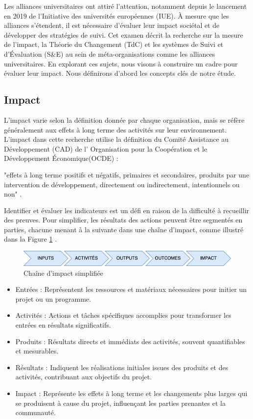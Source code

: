 Les alliances universitaires ont attiré l'attention, notamment depuis le lancement en 2019 de l'Initiative des universités européennes (IUE). À mesure que les alliances s'étendent, il est nécessaire d'évaluer leur impact sociétal et de développer des stratégies de suivi. Cet examen décrit la recherche sur la mesure de l'impact, la Théorie du Changement (TdC) et les systèmes de Suivi et d'Évaluation (S\&E) au sein de méta-organisations comme les alliances universitaires. En explorant ces sujets, nous visons à construire un cadre pour évaluer leur impact. Nous définirons d'abord les concepts clés de notre étude.

\subsection{Impact}
L'impact varie selon la définition donnée par chaque organisation, mais se réfère généralement aux effets à long terme des activités sur leur environnement. L'impact dans cette recherche utilise la définition du Comité Assistance au Développement (CAD) de l' Organisation pour la Coopération et le Développement Économique(OCDE) : 

"effets à long terme positifs et négatifs, primaires et secondaires, produits par une intervention de développement, directement ou indirectement, intentionnels ou non" \cite{oecd_quality_2010}.

Identifier et évaluer les indicateurs est un défi en raison de la difficulté à recueillir des preuves. Pour simplifier, les résultats des actions peuvent être segmentés en parties, chacune menant à la suivante dans une chaîne d'impact, comme illustré dans la Figure \ref{fig:simplified-impact-chain} \cite{stein_understanding_2012}.

\begin{figure} [h]
    \centering 
    \includegraphics[width=1\linewidth]{images/Diagrams-IMPACT.png} 
    \caption{Chaîne d'impact simplifiée\cite{peersman_when_2016}}
    \label{fig:simplified-impact-chain} 
\end{figure}

\begin{itemize} 
    \item Entrées : Représentent les ressources et matériaux nécessaires pour initier un projet ou un programme. 
    \item Activités : Actions et tâches spécifiques accomplies pour transformer les entrées en résultats significatifs. 
    \item Produits : Résultats directs et immédiats des activités, souvent quantifiables et mesurables. 
    \item Résultats : Indiquent les réalisations initiales issues des produits et des activités, contribuant aux objectifs du projet. 
    \item Impact : Représente les effets à long terme et les changements plus larges qui se produisent à cause du projet, influençant les parties prenantes et la communauté. 
\end{itemize}

